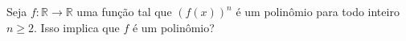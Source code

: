Seja \(f \colon \mathbb{R} \to \mathbb{R}\) uma função tal que \((f(x))^{n}\) é um polinômio para todo inteiro \(n\geq 2\). Isso implica que \(f\) é um polinômio?
